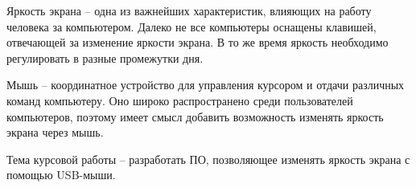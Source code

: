 Яркость экрана -- одна из важнейших характеристик, влияющих на работу человека за компьютером.
Далеко не все компьютеры оснащены клавишей, отвечающей за изменение яркости экрана.
В то же время яркость необходимо регулировать в разные промежутки дня.

Мышь -- координатное устройство для управления курсором и отдачи различных команд компьютеру.
Оно широко распространено среди пользователей компьютеров, поэтому имеет смысл добавить возможность изменять яркость экрана через мышь.

Тема курсовой работы -- разработать ПО, позволяющее изменять яркость экрана с помощью USB-мыши.